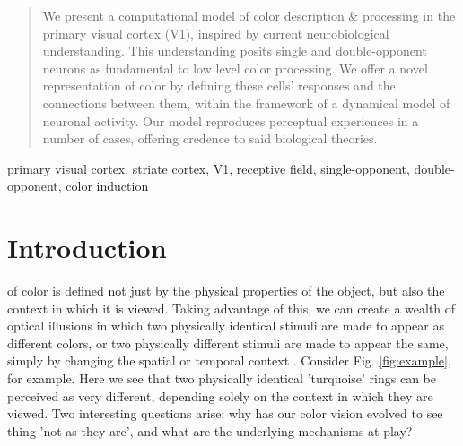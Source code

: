 \documentclass[journal,onecolumn]{IEEEtran}
\begin{document}
\begin{abstract}
We present a computational model of color description \& processing in the primary visual cortex (V1), inspired by current neurobiological understanding. This understanding posits single and double-opponent neurons as fundamental to low level color processing. We offer a novel representation of color by defining these cells' responses and the connections between them, within the framework of a dynamical model of neuronal activity. Our model reproduces perceptual experiences in a number of cases, offering credence to said biological theories.
\end{abstract}

\begin{IEEEkeywords}
primary visual cortex, striate cortex, V1, receptive field, single-opponent, double-opponent, color induction
\end{IEEEkeywords}


%
\IEEEpeerreviewmaketitle


\section{Introduction}

 of color is defined not just by the physical properties of the object, but also the context in which it is viewed. Taking advantage of this, we can create a wealth of optical illusions in which two physically identical stimuli are made to appear as different colors, or two physically different stimuli are made to appear the same, simply by changing the spatial or temporal context \cite{conway:2010}. Consider Fig. \ref{fig:example}, for example. Here we see that two physically identical 'turquoise' rings can be perceived as very different, depending solely on the context in which they are viewed. Two interesting questions arise: why has our color vision evolved to see thing 'not as they are', and what are the underlying mechanisms at play?
\end{document}
